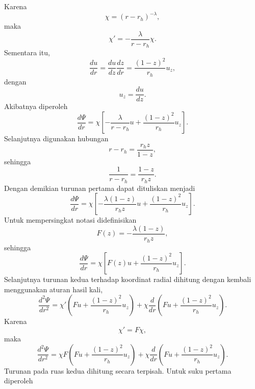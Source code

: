Karena
\begin{equation} \chi = (r-r_h)^{-\lambda}, \end{equation}
maka
\begin{equation} \chi' = -\frac{\lambda}{r-r_h}\chi. \end{equation}
Sementara itu,
\begin{equation} \frac{du}{dr} = \frac{du}{dz} \frac{dz}{dr} = \frac{(1-z)^2}{r_h} u_z, \end{equation}
dengan
\begin{equation} u_z = \frac{du}{dz}. \end{equation}
Akibatnya diperoleh
\begin{equation} \frac{d\Psi}{dr} = \chi \left[ -\frac{\lambda}{r-r_h}u + \frac{(1-z)^2}{r_h}u_z \right]. \end{equation}
Selanjutnya digunakan hubungan
\begin{equation} r-r_h = \frac{r_hz}{1-z}, \end{equation}
sehingga
\begin{equation} \frac{1}{r-r_h} = \frac{1-z}{r_hz}. \end{equation}
Dengan demikian turunan pertama dapat dituliskan menjadi
\begin{equation} \boxed{ \frac{d\Psi}{dr} = \chi \left[ -\frac{\lambda(1-z)}{r_hz} u + \frac{(1-z)^2}{r_h} u_z \right]. } \end{equation}
Untuk mempersingkat notasi didefinisikan
\begin{equation} F(z) = -\frac{\lambda(1-z)}{r_hz}, \end{equation}
sehingga
\begin{equation} \boxed{ \frac{d\Psi}{dr} = \chi \left[ F(z)u + \frac{(1-z)^2}{r_h} u_z \right]. } \end{equation}
Selanjutnya turunan kedua terhadap koordinat radial dihitung dengan kembali menggunakan aturan hasil kali,
\begin{equation} \frac{d^2\Psi}{dr^2} = \chi' \left( Fu + \frac{(1-z)^2}{r_h}u_z \right) + \chi \frac{d}{dr} \left( Fu + \frac{(1-z)^2}{r_h}u_z \right). \end{equation}
Karena
\begin{equation} \chi' = F\chi, \end{equation}
maka
\begin{equation} \frac{d^2\Psi}{dr^2} = \chi F \left( Fu + \frac{(1-z)^2}{r_h}u_z \right) + \chi \frac{d}{dr} \left( Fu + \frac{(1-z)^2}{r_h}u_z \right). \end{equation}
Turunan pada ruas kedua dihitung secara terpisah. Untuk suku pertama diperoleh
